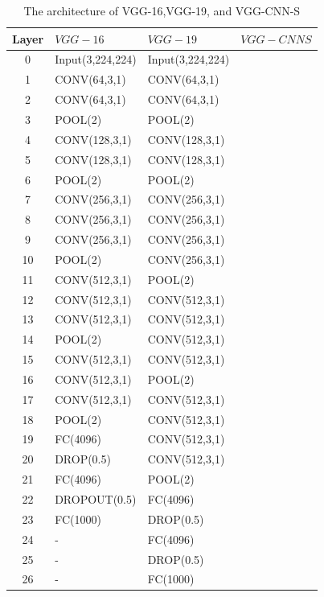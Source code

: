 \documentclass[12pt,a4paper]{article}
\begin{document}
\begin{table}[h!]
	\centering
	\begin{tabular}{c l l l}
	Layer & $VGG-16$ & $VGG-19$ & $VGG-CNNS$ \\ \hline
	0 & Input(3,224,224) & Input(3,224,224) & \\ \hline
	1 & CONV(64,3,1) & CONV(64,3,1) & \\ \hline
	2 & CONV(64,3,1) & CONV(64,3,1) & \\ \hline
	3 & POOL(2) &  POOL(2) & \\ \hline
	4 & CONV(128,3,1) & CONV(128,3,1) & \\ \hline
	5 & CONV(128,3,1) & CONV(128,3,1) & \\ \hline
	6 & POOL(2) &  POOL(2) & \\ \hline
	7 & CONV(256,3,1) & CONV(256,3,1) & \\ \hline
	8 & CONV(256,3,1) & CONV(256,3,1) & \\ \hline
	9 & CONV(256,3,1) & CONV(256,3,1) & \\ \hline
	10 & POOL(2) &  CONV(256,3,1) & \\ \hline
	11 & CONV(512,3,1) & POOL(2) & \\ \hline
	12 & CONV(512,3,1) & CONV(512,3,1) & \\ \hline
	13 & CONV(512,3,1) & CONV(512,3,1) & \\ \hline
	14 & POOL(2) &  CONV(512,3,1) & \\ \hline
	15 & CONV(512,3,1) & CONV(512,3,1) & \\ \hline
	16 & CONV(512,3,1) & POOL(2) & \\ \hline
	17 & CONV(512,3,1) & CONV(512,3,1) & \\ \hline
	18 & POOL(2) &  CONV(512,3,1) & \\ \hline
	19 & FC(4096) & CONV(512,3,1)  &\\ \hline
	20 & DROP(0.5) & CONV(512,3,1)  &\\ \hline
	21 & FC(4096) & POOL(2)  &\\ \hline
	22 & DROPOUT(0.5) &  FC(4096) & \\ \hline
	23 & FC(1000) & DROP(0.5) & \\ \hline
	24 & - & FC(4096)  &\\ \hline
	25 & - &  DROP(0.5)  &\\ \hline
	26 & - &  FC(1000)  &\\ \hline
	\end{tabular}
	\caption{The architecture of VGG-16,VGG-19, and VGG-CNN-S}
	\label{VGGmodels}
\end{table}
\end{document}
